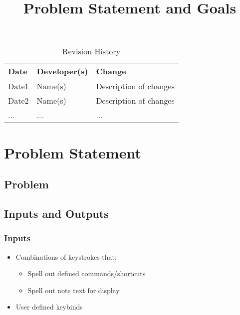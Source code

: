 \documentclass{article}
\title{Problem Statement and Goals\\\progname}
\author{\authname}
\date{}
\begin{document}
\maketitle

\begin{table}[hp]
\caption{Revision History} \label{TblRevisionHistory}
\begin{tabularx}{\textwidth}{llX}
\toprule
\textbf{Date} & \textbf{Developer(s)} & \textbf{Change}\\
\midrule
Date1 & Name(s) & Description of changes\\
Date2 & Name(s) & Description of changes\\
... & ... & ...\\
\bottomrule
\end{tabularx}
\end{table}

\section{Problem Statement}



\subsection{Problem}

\subsection{Inputs and Outputs}



\subsubsection{Inputs}
\begin{itemize}
	\item Combinations of keystrokes that:
	      \begin{itemize}
		      \item Spell out defined commands/shortcuts
		      \item Spell out note text for display
	      \end{itemize}
	\item User defined keybinds
\end{itemize}
\end{document}
